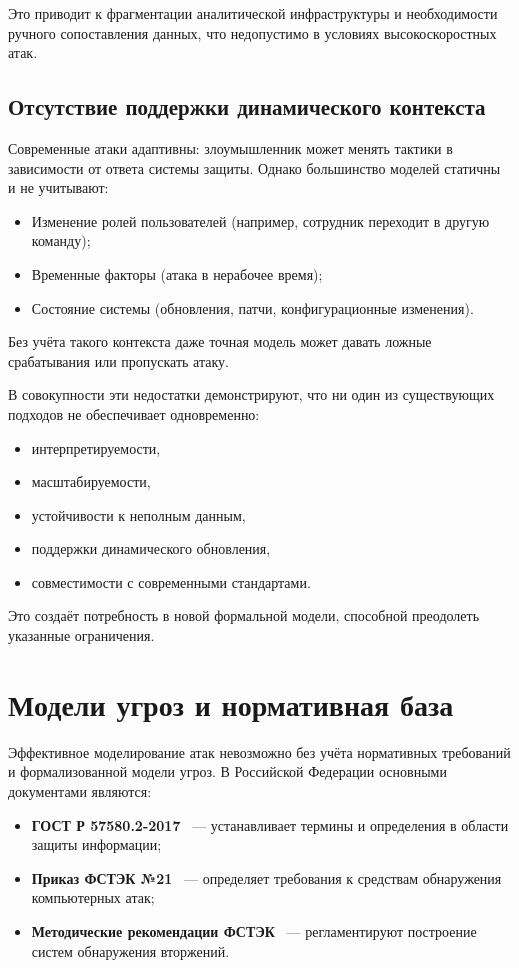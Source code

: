 Это приводит к фрагментации аналитической инфраструктуры и необходимости ручного сопоставления данных, что недопустимо в условиях высокоскоростных атак.

\subsection{Отсутствие поддержки динамического контекста}

Современные атаки адаптивны: злоумышленник может менять тактики в зависимости от ответа системы защиты. Однако большинство моделей статичны и не учитывают:

\begin{itemize}
    \item Изменение ролей пользователей (например, сотрудник переходит в другую команду);
    \item Временные факторы (атака в нерабочее время);
    \item Состояние системы (обновления, патчи, конфигурационные изменения).
\end{itemize}

Без учёта такого контекста даже точная модель может давать ложные срабатывания или пропускать атаку.

В совокупности эти недостатки демонстрируют, что ни один из существующих подходов не обеспечивает одновременно:
\begin{itemize}
    \item интерпретируемости,
    \item масштабируемости,
    \item устойчивости к неполным данным,
    \item поддержки динамического обновления,
    \item совместимости с современными стандартами.
\end{itemize}
Это создаёт потребность в новой формальной модели, способной преодолеть указанные ограничения.

\section{Модели угроз и нормативная база}\label{sec:ch1/sec4}

Эффективное моделирование атак невозможно без учёта нормативных требований и формализованной модели угроз. В Российской Федерации основными документами являются:

\begin{itemize}
    \item \textbf{ГОСТ Р 57580.2-2017}~\cite{GOSTR575802017} — устанавливает термины и определения в области защиты информации;
    \item \textbf{Приказ ФСТЭК №21}~\cite{FSTEKOrder21} — определяет требования к средствам обнаружения компьютерных атак;
    \item \textbf{Методические рекомендации ФСТЭК}~\cite{FSTEK2015} — регламентируют построение систем обнаружения вторжений.
\end{itemize}

